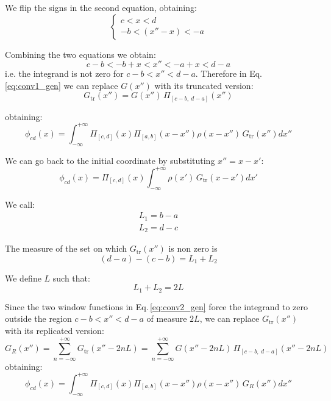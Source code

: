 We flip the signs in the second equation, obtaining:
\begin{equation}
\begin{cases}
c < x < d\\
-b < (x''-x) <-a
\end{cases}
\end{equation}

Combining the two equations we obtain:
\begin{equation}
c-b<-b + x < x'' <-a+x<d-a
\end{equation}
i.e. the integrand is not zero for $c-b< x'' <d-a$.
Therefore in Eq.\,\eqref{eq:conv1_gen} we can replace $G(x'')$ with its truncated version:
\begin{equation}
G_\text{tr}(x'') = G(x'')\,\Pi_{[c-b,~d-a]}
\left(
{x''}
\right)
\end{equation}

obtaining:
\begin{equation}
\phi_{cd}(x) = 
\int_{-\infty}^{+\infty} 
\Pi_{[c,d]}\left({x}\right)
\Pi_{[a,b]}\left({x-x''}\right)
\rho(x-x'')\,G_\text{tr}(x'') dx''
\label{eq:conv2_gen}
\end{equation}


We can go back to the initial coordinate by substituting $x'' = x-x'$:
\begin{equation}
\phi_{cd}(x) = 
\Pi_{[c,d]}\left({x}\right)
\int_{-\infty}^{+\infty} 
\rho(x')\,G_\text{tr}(x-x') dx'
\end{equation}


We call:
\begin{align}
L_1 = b - a\\
L_2 = d - c 
\end{align}

The measure of the set on which $G_\text{tr}(x'')$ is non zero is 
%
\begin{equation}
(d-a) - (c - b) = L_1+ L_2
\end{equation}

We define $L$ such that:
\begin{equation}
L_1+ L_2 = 2L
\end{equation}

Since the two window functions in Eq.\,\ref{eq:conv2_gen} force the integrand to zero outside the region $c-b< x'' <d-a$ of measure $2L$, we can replace $G_\text{tr}(x'')$ with its replicated version:
\begin{equation}
G_{R}(x'') = \sum_{n=-\infty}^{+\infty}G_\text{tr}(x''-2nL) = \sum_{n=-\infty}^{+\infty}G(x'' -2nL)\,\Pi_{[c-b,~d-a]}
\left(
{x''-2nL}
\right)
\label{eq:GLR_gen}
\end{equation}
obtaining:
\begin{equation}
\phi_{cd}(x) = 
\int_{-\infty}^{+\infty} 
\Pi_{[c,d]}\left({x}\right)
\Pi_{[a,b]}\left({x-x''}\right)
\rho(x-x'')\,G_{R}(x'') dx''
\end{equation}

